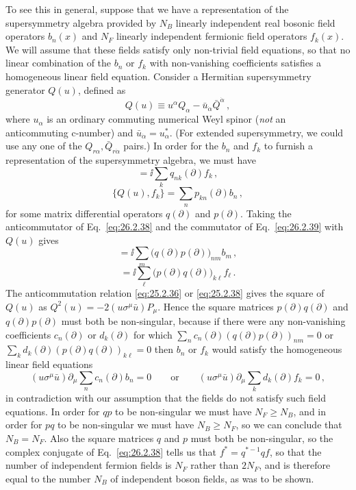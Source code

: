 To see this in general, suppose that we have a representation of the
supersymmetry algebra provided by $N_B$ linearly independent real bosonic
field operators $b_n(x)$ and $N_F$ linearly independent fermionic field
operators $f_k(x)$. We will assume that these fields satisfy only non-trivial
field equations, so that no linear combination of the $b_n$ or $f_k$ with
non-vanishing coefficients satisfies a homogeneous linear field equation.
Consider a Hermitian supersymmetry generator \(Q(u)\), defined as
\begin{equation}
  Q(u)\equiv u^\alpha Q_\alpha
    -\bar u_{\dot\alpha}\bar Q^{\dot\alpha}\,,
  \tag{26.2.37}\label{eq:26.2.37}
\end{equation}
where \(u_\alpha\) is an ordinary commuting numerical Weyl spinor
(\emph{not} an anticommuting c-number) and
\(\bar u_{\dot\alpha}=u_\alpha^*\). (For extended supersymmetry, we could
use any one of the \(Q_{r\alpha},\bar Q_{r\dot\alpha}\) pairs.) In order for
the $b_n$ and $f_k$ to furnish a representation of the supersymmetry algebra,
we must have
\begin{equation}
  [Q(u),b_n]=\ii\sum_k q_{nk}(\partial)f_k\,,
  \tag{26.2.38}\label{eq:26.2.38}
\end{equation}
\begin{equation}
  \{Q(u),f_k\}=\sum_n p_{kn}(\partial)b_n\,,
  \tag{26.2.39}\label{eq:26.2.39}
\end{equation}
for some matrix differential operators $q(\partial)$ and $p(\partial)$.
Taking the anticommutator of Eq.~\eqref{eq:26.2.38} and the commutator of
Eq.~\eqref{eq:26.2.39} with $Q(u)$ gives
\begin{equation}
  [Q^2(u),b_n]
  =\ii\sum_m\bigl(q(\partial)p(\partial)\bigr)_{nm}b_m\,,
  \tag{26.2.40}\label{eq:26.2.40}
\end{equation}
\begin{equation}
  [Q^2(u),f_k]
  =\ii\sum_\ell\bigl(p(\partial)q(\partial)\bigr)_{k\ell}f_\ell\,.
  \tag{26.2.41}\label{eq:26.2.41}
\end{equation}
The anticommutation relation \eqref{eq:25.2.36} or \eqref{eq:25.2.38} gives
the square of \(Q(u)\) as
\(Q^2(u)=-2(u\sigma^\mu\bar u)P_\mu\). Hence the
square matrices $p(\partial)q(\partial)$ and $q(\partial)p(\partial)$ must
both be non-singular, because if there were any non-vanishing coefficients
$c_n(\partial)$ or $d_k(\partial)$ for which
$\sum_n c_n(\partial)(q(\partial)p(\partial))_{nm}=0$ or
$\sum_k d_k(\partial)(p(\partial)q(\partial))_{k\ell}=0$ then $b_n$ or $f_k$
would satisfy the homogeneous linear field equations
\[
  (u\sigma^\mu\bar u)\partial_\mu
    \sum_n c_n(\partial)b_n=0
  \qquad\text{or}\qquad
  (u\sigma^\mu\bar u)\partial_\mu
    \sum_k d_k(\partial)f_k=0\,,
\]
in contradiction with our assumption that the fields do not satisfy such
field equations. In order for $qp$ to be non-singular we must have
$N_F\geq N_B$, and in order for $pq$ to be non-singular we must have
$N_B\geq N_F$, so we can conclude that $N_B=N_F$. Also the square matrices
$q$ and $p$ must both be non-singular, so the complex conjugate of
Eq.~\eqref{eq:26.2.38} tells us that $f^*=q^{*-1}qf$, so that the number of
independent fermion fields is $N_F$ rather than $2N_F$, and is therefore
equal to the number $N_B$ of independent boson fields, as was to be shown.
